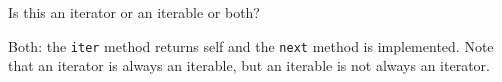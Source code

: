 \begin{blocksection}
\question Is this an iterator or an iterable or both?
\begin{solution}[0.5in]
Both: the \lstinline$iter$ method returns self and the \lstinline$next$ method is
implemented. Note that an iterator is always an iterable, but an iterable is not
always an iterator.
\end{solution}
\end{blocksection}
